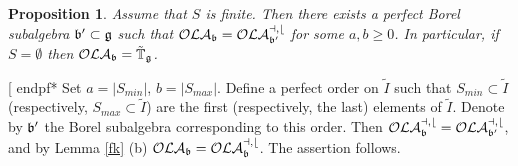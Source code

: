 \documentclass[12pt]{amsart}
\makeatletter
\def\mathbb{\Bbb}
\def\mathfrak{\frak}
\newenvironment{proof}{%
         \@ifnextchar[{%
                       \expandafter\let\expandafter\end@proof
                         \csname endpf*\endcsname
                         \my@proof
                      }{\let\end@proof\endpf\pf}%
        }{\end@proof}
\def\my@proof[#1]{\@nameuse{pf*}{#1}}
\def\mathcal{\cal}
\def\@putname#1#2#3#4{\def\@@ref{#3}\let\old@bf\bf
        \def\bf##1{\old@bf\if?\noexpand##1?{#4}\else##1\fi}%
        #1{#2}%
        \let\bf\old@bf}
\def\@putname#1#2#3#4{\def\@@ref{#3}\let\old@bf\bf    %
        \let\old@reset@font\reset@font                  %
        \def\bf##1{\old@bf\if?\noexpand##1?{#4}\else##1\fi}%
        \def\reset@font##1##2{\old@reset@font##1\if?\noexpand##2?{#4}\else##2\fi}#1{#2}%
        \let\bf\old@bf\let\reset@font\old@reset@font}
\let\my@ref=\ref
\def\ref#1{\@putname\my@ref{#1}{#1}{\tiny\rm\@@ref}}
\theoremstyle{plain} %
\numberwithin{equation}{section}
\theoremstyle{definition}
\theoremstyle{remark}
\theoremstyle{plain} %
\newtheorem{proposition}[definition]{Proposition}
\newcommand{\fg}{\mathfrak{g}}
\newcommand{\fb}{\mathfrak{b}}
\makeatother
\begin{document}
\begin{proposition}\label{prop:fin} Assume that $S$ is finite. Then there exists a perfect Borel subalgebra
  $\fb'\subset\fg$ such that $\mathcal{OLA}_{\fb}=\mathcal{OLA}^{a,b}_{\fb'}$ for some $a,b\geq 0$. In particular, if $S=\emptyset$ then
  $\mathcal{OLA}_{\fb}=\tilde{\mathbb T}_{\fg}$.
  \end{proposition}
  \begin{proof} Set $a=|S_{min}|$, $b=|S_{max}|$. Define a perfect order on $\tilde I$ such that $S_{min}\subset \tilde I$
    (respectively, $S_{max}\subset\tilde I$) are the first  (respectively, the last) elements of $\tilde I$. Denote by $\fb'$ the Borel subalgebra corresponding
    to this order. Then 
    $\mathcal{OLA}^{a,b}_{\fb}=\mathcal{OLA}^{a,b}_{\fb'}$, and by Lemma \ref{fk}(b) $\mathcal{OLA}_{\fb}=\mathcal{OLA}^{a,b}_{\fb}$.
 The assertion follows.
  \end{proof}
\end{document}
